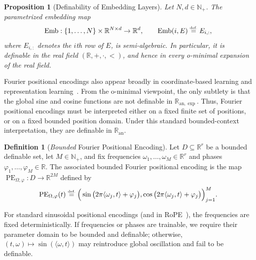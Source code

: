 \documentclass{article}
\newcommand{\eqdef}{\ensuremath{\stackrel{\mbox{\upshape\tiny def.}}{=}}}
\theoremstyle{plain}
\newtheorem{proposition}[theorem]{Proposition}
\theoremstyle{definition}
\newtheorem{definition}[theorem]{Definition}
\theoremstyle{remark}
\theoremstyle{plain}
\numberwithin{thm}{section}
\theoremstyle{definition}
\numberwithin{equation}{section}
\begin{document}
\begin{proposition}[Definability of Embedding Layers]
\label{prop:embedding_layers_definable}
Let $N,d\in\mathbb{N}_+$.  The parametrized embedding map
\[
    \operatorname{Emb}:
    \{1,\dots,N\}\times\mathbb{R}^{N\times d}
    \to
    \mathbb{R}^d,
    \qquad
    \operatorname{Emb}(i,E)
    \eqdef
    E_{i,:},
\]
where $E_{i,:}$ denotes the $i$th row of $E$, is semi-algebraic.  In particular,
it is definable in the real field $(\mathbb{R},+,\cdot,<)$, and hence in every
o-minimal expansion of the real field.
\end{proposition}





Fourier positional encodings also appear broadly in coordinate-based learning and representation learning~\citep{tancik2020fourier}.  From the o-minimal viewpoint, the only subtlety is that the global sine and cosine functions are not definable in $\mathbb{R}_{\mathrm{an},\exp}$.  Thus, Fourier positional encodings must be interpreted either on a fixed finite set of positions, or on a fixed bounded position domain.  Under this standard bounded-context interpretation, they are definable in $\mathbb{R}_{\mathrm{an}}$.

\begin{definition}[\textit{Bounded} Fourier Positional Encoding]
\label{def:bounded_fourier_positional_encoding}
Let $D\subseteq\mathbb{R}^r$ be a bounded definable set, let $M\in\mathbb{N}_+$, and fix frequencies $\omega_1,\dots,\omega_M\in\mathbb{R}^r$ and phases $\varphi_1,\dots,\varphi_M\in\mathbb{R}$.  The associated bounded Fourier positional encoding is the map
$
    \operatorname{PE}_{\Omega,\varphi}:D\to\mathbb{R}^{2M}
$
defined by
$$
    \operatorname{PE}_{\Omega,\varphi}(t)
    \eqdef
    \Big(
        \sin\big(2\pi\langle \omega_j,t\rangle+\varphi_j\big),
        \cos\big(2\pi\langle \omega_j,t\rangle+\varphi_j\big)
    \Big)_{j=1}^M .
$$
\end{definition}
For standard sinusoidal positional encodings (and in RoPE~\cite{su2024roformer}), the frequencies are fixed deterministically.  If frequencies or phases are trainable, we require their parameter domain to be bounded and definable; otherwise, $(t,\omega)\mapsto \sin(\langle \omega,t\rangle)$ may reintroduce global oscillation and fail to be definable.
\end{document}
